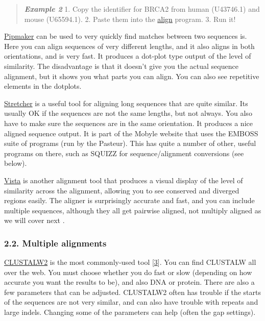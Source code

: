 \documentclass[]{article}
\begin{document}
\begin{quote}
\emph{\textbf{Example 2}} 1. Copy the identifier for BRCA2 from human
(U43746.1) and mouse (U65594.1). 2. Paste them into the
\href{http://blast.ncbi.nlm.nih.gov/Blast.cgi?PAGE_TYPE=BlastSearch\&BLAST_SPEC=blast2seq\&LINK_LOC=align2seq}{align}
program. 3. Run it!
\end{quote}

\href{http://pipmaker.bx.psu.edu/cgi-bin/pipmaker?advanced}{Pipmaker}
can be used to very quickly find matches between two sequences is. Here
you can align sequences of very different lengths, and it also aligns in
both orientations, and is very fast. It produces a dot-plot type output
of the level of similarity. The disadvantage is that it doesn't give you
the actual sequence alignment, but it shows you what parts you can
align. You can also see repetitive elements in the dotplots.

\href{http://mobyle.pasteur.fr/cgi-bin/MobylePortal/portal.py?form=stretcher}{Stretcher}
is a useful tool for aligning long sequences that are quite similar. Its
usually OK if the sequences are not the same lengths, but not always.
You also have to make sure the sequences are in the same orientation. It
produces a nice aligned sequence output. It is part of the Mobyle
website that uses the EMBOSS suite of programs (run by the Pasteur).
This has quite a number of other, useful programs on there, such as
SQUIZZ for sequence/alignment conversions (see below).

\href{http://genome.lbl.gov/vista/index.shtml}{Vista} is another
alignment tool that produces a visual display of the level of similarity
across the alignment, allowing you to see conserved and diverged regions
easily. The aligner is surprisingly accurate and fast, and you can
include multiple sequences, although they all get pairwise aligned, not
multiply aligned as we will cover next .

\subsubsection{2.2. Multiple alignments}\label{multiple-alignments}

\href{https://www.ebi.ac.uk/Tools/msa/clustalw2/}{CLUSTALW2} is the most
commonly-used tool
{[}\href{http://www.ncbi.nlm.nih.gov/pubmed/17846036}{3}{]}. You can
find CLUSTALW all over the web. You must choose whether you do fast or
slow (depending on how accurate you want the results to be), and also
DNA or protein. There are also a few parameters that can be adjusted.
CLUSTALW2 often has trouble if the starts of the sequences are not very
similar, and can also have trouble with repeats and large indels.
Changing some of the parameters can help (often the gap settings).
\end{document}
